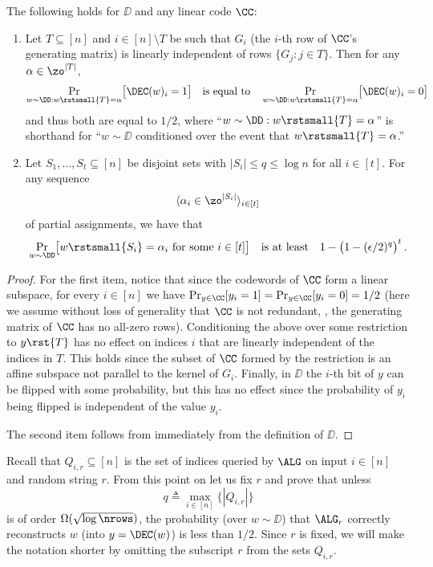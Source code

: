 \begin{lemma}\label{lem:cdwD} The following holds for $\DD$  and any linear code $\CC$:
\begin{enumerate}
\item Let $T \subseteq [n]$ and $i \in [n] \setminus T$ be such that $G_i$ 
(the
%
$i$-th 
row of $\CC$'s generating matrix) is linearly independent of rows
$\{G_j: j \in T\}$. Then for any $\alpha \in \zo^{|T|}$,
\[
\Pr_{w \sim \DD : w\rstsmall{T}=\alpha} \bigl[\DEC(w)_i = 1\bigr]\quad\text{is equal
  to}\quad \Pr_{w \sim \DD : w\rstsmall{T}=\alpha} \bigl[\DEC(w)_i = 0\bigr]
\]
and thus both are equal to ${1}/{2}$,
where ``$w \sim \DD : w\rstsmall{T}=\alpha$'' is shorthand for ``$w \sim \DD$ conditioned over the event that $w\rstsmall{T}=\alpha$.''
\item Let $S_1,\ldots,S_t \subseteq [n]$ be disjoint sets with $|S_i|
  \leq q \leq \log n$ for all $i \in [t]$. For any sequence 
\[
\langle
  \alpha_i \in \zo^{|S_i|} \rangle_{i \in [t]}\] of partial
  assignments, we have that
  \[
  \Pr_{w \sim \DD}\bigl[w\rstsmall{S_i} = \alpha_i \mathrm{\ for\ some\ }i
  \in [t]\bigr]\quad\text{is at least}\quad 1-\bigl(1-(\epsilon/2)^q\bigr)^t\,.
\]
\end{enumerate}
\end{lemma}

\begin{proof}
For the first item, notice that since the codewords of $\CC$ form a linear subspace, for every $i \in [n]$ we have $\Pr_{y \in \CC}[y_i = 1] = \Pr_{y \in \CC}[y_i = 0] = 1/2$ (here we assume without loss of generality that $\CC$ is not redundant, \ie, the generating matrix of $\CC$ has no all-zero rows).
Conditioning the above over some restriction to $y\rst{T}$ has no effect on indices $i$ that are linearly independent of the indices in $T$. This holds since the subset of $\CC$ formed by the restriction is an affine subspace not parallel to the kernel of $G_i$.
Finally, in $\DD$ the 
%
$i$-th 
bit of $y$ can be flipped with some probability, but this has no effect since the probability of $y_i$ being flipped is independent of the value $y_i$.

The second item follows from immediately from the definition of $\DD$.
\end{proof}


Recall that $Q_{i,r}\subseteq [n]$ is the set of indices queried by
$\ALG$ on input $i\in [n]$ and random string $r$. {}From this point on
let us fix $r$ and prove that unless
\[
q \triangleq \max_{i \in [n]}\bigl\{|Q_{i,r}|\bigr\}
\]
is of order $\Omega(\sqrt{\log \nrows})$, the probability (over $w \sim \DD$) that $\ALG_r$ correctly reconstructs $w$ (into $y=\DEC(w)$) is less than $1/2$.  Since $r$ is fixed, we will make the notation shorter by omitting the subscript $r$ from the sets $Q_{i,r}$.

